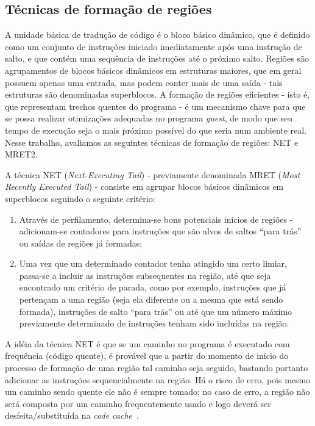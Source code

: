 \documentclass[12pt,twoside]{article}
\newcommand{\ccache}{\emph{code cache}}
\newcommand{\guest}{\emph{guest}}
\newcommand{\qq}[1]{``#1''}
\begin{document}
\subsection{Técnicas de formação de regiões}
\label{sec-formacao}
A unidade básica de tradução de código é o bloco básico dinâmico, que é definido como um conjunto de instruções iniciado imediatamente após uma instrução de salto, e que contém uma sequência de instruções até o próximo salto. Regiões são agrupamentos de blocos básicos dinâmicos em estruturas maiores, que em geral possuem apenas uma entrada, mas podem conter mais de uma saída - tais estruturas são denominadas superblocos. A formação de regiões eficientes - isto é, que representam trechos quentes do programa - é um mecanismo chave para que se possa realizar otimizações adequadas no programa \guest, de modo que seu tempo de execução seja o mais próximo possível do que seria num ambiente real. Nesse trabalho, avaliamos as seguintes técnicas de formação de regiões: NET e MRET2. 

A técnica NET (\emph{Next-Executing Tail}) \cite{net-region} - previamente denominada MRET (\emph{Most Recently Executed Tail}) - consiste em agrupar blocos básicos dinâmicos em superblocos seguindo o seguinte critério:
\begin{enumerate}
\item Através de perfilamento, determina-se bons potenciais inícios de regiões - adicionam-se contadores para instruções que são alvos de saltos \qq{para trás} ou saídas de regiões já formadas;


\item Uma vez que um determinado contador tenha atingido um certo limiar, passa-se a incluir as instruções subsequentes na região, até que seja encontrado um critério de parada, como por exemplo, instruções que já pertençam a uma região (seja ela diferente ou a mesma que está sendo formada), instruções de salto \qq{para trás} ou até que um número máximo previamente determinado  de instruções tenham sido incluídas na região.
\end{enumerate}
A idéia da técnica NET é que se um caminho no programa é executado com frequência (código quente), é provável que a partir do momento de início do processo de formação de uma região tal caminho seja seguido, bastando portanto adicionar as instruções sequencialmente na região. Há o risco de erro, pois mesmo um caminho sendo quente ele não é sempre tomado; no caso de erro, a região não será composta por um caminho frequentemente usado e logo deverá ser desfeita/substituída na \ccache~.
\end{document}
